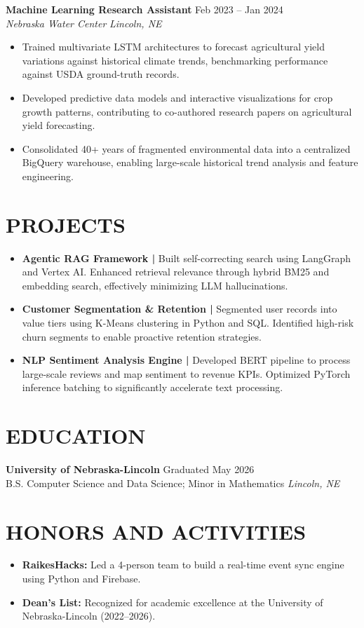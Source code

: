 \vspace{4pt}

\textbf{Machine Learning Research Assistant} \hfill Feb 2023 -- Jan 2024 \\
\textit{Nebraska Water Center} \hfill \textit{Lincoln, NE}
\begin{itemize}
  \item Trained multivariate LSTM architectures to forecast agricultural yield variations against historical climate trends, benchmarking performance against USDA ground-truth records.
  \item Developed predictive data models and interactive visualizations for crop growth patterns, contributing to co-authored research papers on agricultural yield forecasting.
  \item Consolidated 40+ years of fragmented environmental data into a centralized BigQuery warehouse, enabling large-scale historical trend analysis and feature engineering.
\end{itemize}

\section*{PROJECTS}
\begin{itemize}[leftmargin=0.7em, label={}, itemsep=2pt, parsep=0pt, topsep=2pt]
  \item \textbf{Agentic RAG Framework |} Built self-correcting search using LangGraph and Vertex AI. Enhanced retrieval relevance through hybrid BM25 and embedding search, effectively minimizing LLM hallucinations.
  \item \textbf{Customer Segmentation \& Retention |} Segmented user records into value tiers using K-Means clustering in Python and SQL. Identified high-risk churn segments to enable proactive retention strategies.
  \item \textbf{NLP Sentiment Analysis Engine |} Developed BERT pipeline to process large-scale reviews and map sentiment to revenue KPIs. Optimized PyTorch inference batching to significantly accelerate text processing.
\end{itemize}

\section*{EDUCATION}
\textbf{University of Nebraska-Lincoln} \hfill Graduated May 2026 \\
B.S. Computer Science and Data Science; Minor in Mathematics \hfill \textit{Lincoln, NE}

\section*{HONORS AND ACTIVITIES}
\begin{itemize}[leftmargin=0.7em, label={}, itemsep=1pt, parsep=0pt, topsep=2pt]
  \item \textbf{RaikesHacks:} Led a 4-person team to build a real-time event sync engine using Python and Firebase.
  \item \textbf{Dean's List:} Recognized for academic excellence at the University of Nebraska-Lincoln (2022--2026).
\end{itemize}